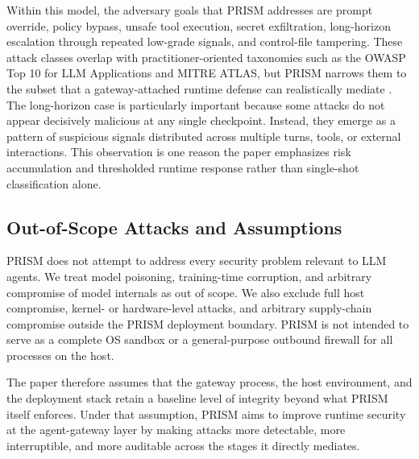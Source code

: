 Within this model, the adversary goals that PRISM addresses are prompt override, policy bypass, unsafe tool execution, secret exfiltration, long-horizon escalation through repeated low-grade signals, and control-file tampering. These attack classes overlap with practitioner-oriented taxonomies such as the OWASP Top 10 for LLM Applications and MITRE ATLAS, but PRISM narrows them to the subset that a gateway-attached runtime defense can realistically mediate \cite{owaspllmtop102025,mitreatlas2023}. The long-horizon case is particularly important because some attacks do not appear decisively malicious at any single checkpoint. Instead, they emerge as a pattern of suspicious signals distributed across multiple turns, tools, or external interactions. This observation is one reason the paper emphasizes risk accumulation and thresholded runtime response rather than single-shot classification alone.

\subsection{Out-of-Scope Attacks and Assumptions}

PRISM does not attempt to address every security problem relevant to LLM agents. We treat model poisoning, training-time corruption, and arbitrary compromise of model internals as out of scope. We also exclude full host compromise, kernel- or hardware-level attacks, and arbitrary supply-chain compromise outside the PRISM deployment boundary. PRISM is not intended to serve as a complete OS sandbox or a general-purpose outbound firewall for all processes on the host.

The paper therefore assumes that the gateway process, the host environment, and the deployment stack retain a baseline level of integrity beyond what PRISM itself enforces. Under that assumption, PRISM aims to improve runtime security at the agent-gateway layer by making attacks more detectable, more interruptible, and more auditable across the stages it directly mediates.

